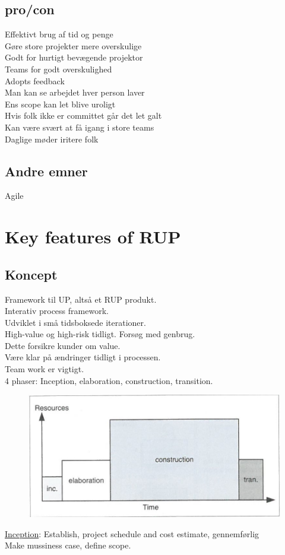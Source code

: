 \documentclass[11pt,a4paper]{article}
\begin{document}
\subsection{pro/con}
Effektivt brug af tid og penge\\
Gøre store projekter mere overskulige\\
Godt for hurtigt bevægende projektor\\
Teams for godt overskulighed\\
Adopts feedback\\
Man kan se arbejdet hver person laver\\
Ens scope kan let blive uroligt\\
Hvis folk ikke er committet går det let galt\\
Kan være svært at få igang i store teams\\
Daglige møder iritere folk\\
\subsection{Andre emner}
Agile
\newpage
\section{Key features of RUP}
\subsection{Koncept}
Framework til UP, altså et RUP produkt.\\
Interativ process framework.\\

Udviklet i små tidsboksede iterationer.\\
High-value og high-risk tidligt. Forsøg med genbrug.\\
Dette forsikre kunder om value.\\
Være klar på ændringer tidligt i processen.\\
Team work er vigtigt.\\
4 phaser: Inception, elaboration, construction, transition.

\begin{figure}[h!]
\includegraphics[scale=1]{rup.png}
\end{figure}
\underline{Inception}: Establish, project schedule and cost estimate, gennemførlig\\
Make mussiness case, define scope.
 
\end{document}

